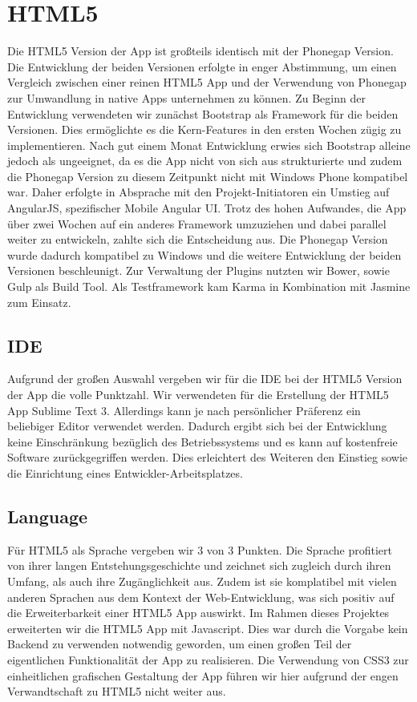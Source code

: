 \section{HTML5}
Die HTML5 Version der App ist großteils identisch mit der Phonegap Version. Die Entwicklung der beiden Versionen erfolgte in enger Abstimmung, um einen Vergleich zwischen einer reinen HTML5 App und der Verwendung von Phonegap zur Umwandlung in native Apps unternehmen zu können. Zu Beginn der Entwicklung verwendeten wir zunächst Bootstrap als Framework für die beiden Versionen. Dies ermöglichte es die Kern-Features in den ersten Wochen zügig zu implementieren. Nach gut einem Monat Entwicklung erwies sich Bootstrap alleine jedoch als ungeeignet, da es die App nicht von sich aus strukturierte und zudem die Phonegap Version zu diesem Zeitpunkt nicht mit Windows Phone kompatibel war. Daher erfolgte in Absprache mit den Projekt-Initiatoren ein Umstieg auf AngularJS, spezifischer Mobile Angular UI. Trotz des hohen  Aufwandes, die App über zwei Wochen auf ein anderes Framework umzuziehen und dabei parallel weiter zu entwickeln, zahlte sich die Entscheidung aus. Die Phonegap Version wurde dadurch kompatibel zu Windows und die weitere Entwicklung der beiden Versionen beschleunigt. Zur Verwaltung der Plugins nutzten wir Bower, sowie Gulp als Build Tool. Als Testframework kam Karma in Kombination mit Jasmine zum Einsatz.

\subsection{IDE}
Aufgrund der großen Auswahl vergeben wir für die IDE bei der HTML5 Version der App die volle Punktzahl. Wir verwendeten für die Erstellung der HTML5 App Sublime Text 3. Allerdings kann je nach persönlicher Präferenz ein beliebiger Editor verwendet werden. Dadurch ergibt sich bei der Entwicklung keine Einschränkung bezüglich des Betriebssystems und es kann auf kostenfreie Software zurückgegriffen werden. Dies erleichtert des Weiteren den Einstieg sowie die Einrichtung eines Entwickler-Arbeitsplatzes.

\subsection{Language}
Für HTML5 als Sprache vergeben wir 3 von 3 Punkten. Die Sprache profitiert von ihrer langen Entstehungsgeschichte und zeichnet sich zugleich durch ihren Umfang, als auch ihre Zugänglichkeit aus. Zudem ist sie komplatibel mit vielen anderen Sprachen aus dem Kontext der Web-Entwicklung, was sich positiv auf die Erweiterbarkeit einer HTML5 App auswirkt. Im Rahmen dieses Projektes erweiterten wir die HTML5 App mit Javascript. Dies war durch die Vorgabe kein Backend zu verwenden notwendig geworden, um einen großen Teil der eigentlichen Funktionalität der App zu realisieren. Die Verwendung von CSS3 zur einheitlichen grafischen Gestaltung der App führen wir hier aufgrund der engen Verwandtschaft zu HTML5 nicht weiter aus.

